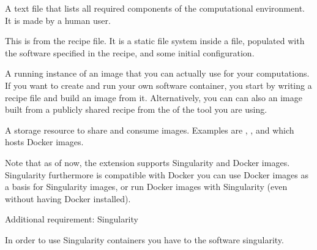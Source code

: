 \begin{description}
\sphinxAtStartPar
A text file that lists all required components of the computational environment.
It is made by a human user.

\sphinxAtStartPar
This is  from the recipe file. It is a static file system inside a file,
populated with the software specified in the recipe, and some initial configuration.

\sphinxAtStartPar
A running instance of an image that you can actually use for your computations.
If you want to create and run your own software container, you start by writing
a recipe file and build an image from it. Alternatively, you can can also 
an image built from a publicly shared recipe from the  of the tool you are using.

\sphinxAtStartPar
A storage resource to share and consume images. Examples are
{\hyperref[\detokenize{glossary:term-Singularity-Hub}]{}}, {\hyperref[\detokenize{glossary:term-Docker-Hub}]{}}, and  which hosts Docker images.

\end{description}

\sphinxAtStartPar
Note that as of now, the  extension supports
Singularity and Docker images.
Singularity furthermore is compatible with Docker \textendash{} you can use
Docker images as a basis for Singularity images, or run Docker images with
Singularity (even without having Docker installed).
\begin{importantnote}[before title={\thetcbcounter\ }, check odd page=true]{Additional requirement: Singularity}

\sphinxAtStartPar
In order to use Singularity containers you have to
 the software singularity.


\end{importantnote}

